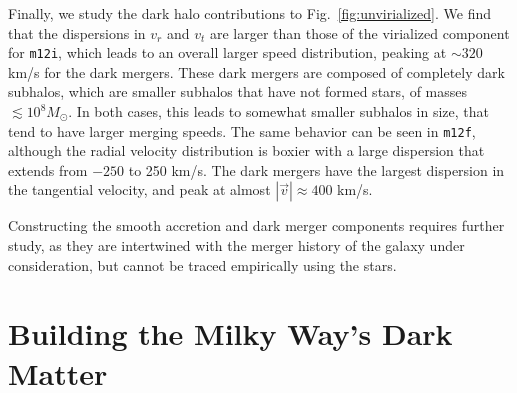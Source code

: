 \documentclass[twocolumn,preprintnumbers]{aastex6}
\DeclareRobustCommand{\Sec}[1]{Sec.~\ref{#1}}
\DeclareRobustCommand{\Fig}[1]{Fig.~\ref{#1}}
\def\lmn#1{\textcolor{blue}{[LN: #1]}}
\newcommand{\mi}{\texttt{m12i}}
\newcommand{\mf}{\texttt{m12f}}
\begin{document}
Finally, we study the dark halo contributions to \Fig{fig:unvirialized}. We find that the dispersions in $v_r$ and $v_t$ are larger than those of the virialized component for \mi, which leads to an overall larger speed distribution, peaking at $\sim 320$ km/s for the dark mergers. These dark mergers are composed of completely dark subhalos, which are smaller subhalos that have not formed stars, of masses $\lesssim 10^8 M_{\odot}$. In both cases, this leads to somewhat smaller subhalos in size, that tend to have larger merging speeds. The same behavior can be seen in \mf, although the radial velocity distribution is boxier with a large dispersion that extends from $-250$ to 250 km/s. The dark mergers have the largest dispersion in the tangential velocity, and peak at almost $|\vec{v}| \approx 400$ km/s.

Constructing the smooth accretion and dark merger components requires further study, as they are intertwined with the merger history of the galaxy under consideration, but cannot be traced empirically using the stars. 
 
%


\section{Building the Milky Way's Dark Matter}
\label{sec:milky_way}
\end{document}
